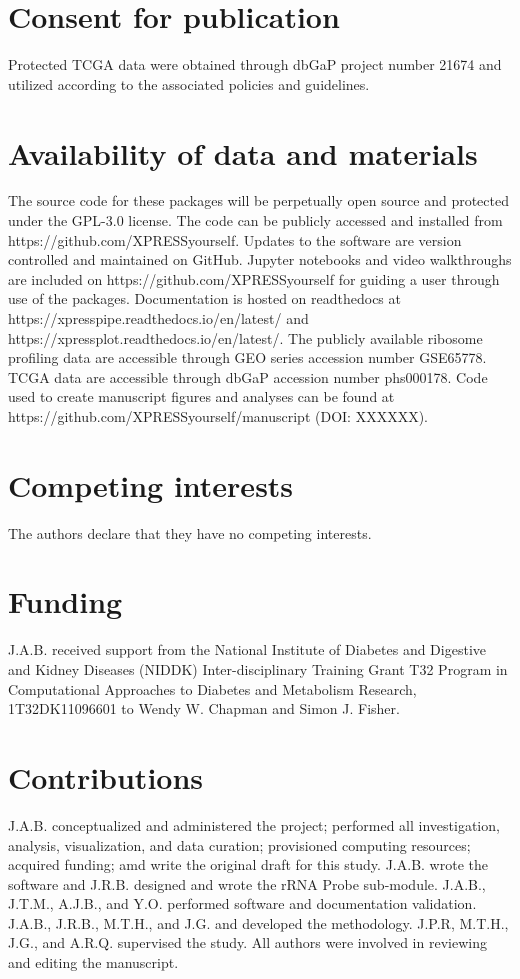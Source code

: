 \documentclass[11pt, a4paper, oneside]{article}
\begin{document}
\section*{Consent for publication}
Protected TCGA data were obtained through dbGaP project number 21674 and utilized according to the associated policies and guidelines.

\section*{Availability of data and materials}
The source code for these packages will be perpetually open source and protected under the GPL-3.0 license. The code can be publicly accessed and installed from https://github.com/XPRESSyourself. Updates to the software are version controlled and maintained on GitHub. Jupyter notebooks and video walkthroughs are included on https://github.com/XPRESSyourself for guiding a user through use of the packages. Documentation is hosted on readthedocs \cite{readthedocs} at https://xpresspipe.readthedocs.io/en/latest/ and https://xpressplot.readthedocs.io/en/latest/. The publicly available ribosome profiling data are accessible through GEO series accession number GSE65778. TCGA data are accessible through dbGaP accession number phs000178. Code used to create manuscript figures and analyses can be found at https://github.com/XPRESSyourself/manuscript (DOI: XXXXXX).

\section*{Competing interests}
The authors declare that they have no competing interests.

\section*{Funding}
J.A.B. received support from the National Institute of Diabetes and Digestive and Kidney Diseases (NIDDK) Inter-disciplinary Training Grant T32 Program in Computational Approaches to Diabetes and Metabolism Research, 1T32DK11096601 to Wendy W. Chapman and Simon J. Fisher.

\section*{Contributions}
J.A.B. conceptualized and administered the project; performed all investigation, analysis, visualization, and data curation; provisioned computing resources; acquired funding; amd write the original draft for this study. J.A.B. wrote the software and J.R.B. designed and wrote the rRNA Probe sub-module. J.A.B., J.T.M., A.J.B., and Y.O. performed software and documentation validation. J.A.B., J.R.B., M.T.H., and J.G. and developed the methodology. J.P.R, M.T.H., J.G., and A.R.Q. supervised the study. All authors were involved in reviewing and editing the manuscript.
\end{document}
